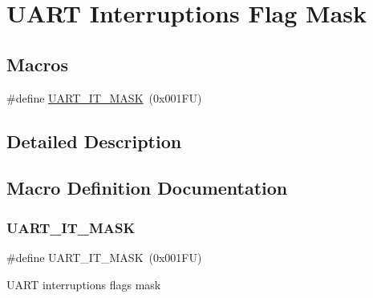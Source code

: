 \hypertarget{group___u_a_r_t___interruption___mask}{}\section{U\+A\+RT Interruptions Flag Mask}
\label{group___u_a_r_t___interruption___mask}
\subsection*{Macros}
\begin{DoxyCompactItemize}
\item 
\#define \hyperlink{group___u_a_r_t___interruption___mask_ga869439269c26e8dee93d49b1c7e67448}{U\+A\+R\+T\+\_\+\+I\+T\+\_\+\+M\+A\+SK}~(0x001\+F\+U)
\end{DoxyCompactItemize}


\subsection{Detailed Description}


\subsection{Macro Definition Documentation}
\mbox{\label{group___u_a_r_t___interruption___mask_ga869439269c26e8dee93d49b1c7e67448}} 
\subsubsection{\texorpdfstring{U\+A\+R\+T\+\_\+\+I\+T\+\_\+\+M\+A\+SK}{UART\_IT\_MASK}}
{\footnotesize\ttfamily \#define U\+A\+R\+T\+\_\+\+I\+T\+\_\+\+M\+A\+SK~(0x001\+F\+U)}

U\+A\+RT interruptions flags mask 